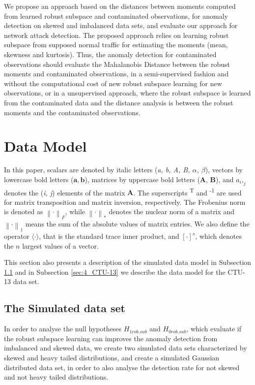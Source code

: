We propose an approach based on the distances between moments computed from learned robust subspace and contaminated observations, for anomaly detection on skewed and imbalanced data sets, and evaluate our approach for network attack detection. The proposed approach relies on learning robust subspace from supposed normal traffic for estimating the moments (mean, skewness and kurtosis). Thus, the anomaly detection for contaminated observations should evaluate the Mahalanobis Distance between the robust moments and contaminated observations, in a semi-supervised fashion and without the computational cost of new robust subspace learning for new observations, or in a unsupervised approach, where the robust subspace is learned from the contaminated data and the distance analysis is between the robust moments and the contaminated observations. 


\section{Data Model}
\label{sec:4_datamodel}

In this paper, scalars are denoted by italic letters (\emph{a, b, A, B, $\alpha$, $\beta$}), vectors by lowercase bold letters ($\pmb{a}, \pmb{b}$), matrices by uppercase bold letters ($\pmb{A}$, $\pmb{B}$), and $a_i,_j$ denotes the (\emph{i, j}) elements of the matrix $\pmb{A}$. The superscripts \textsuperscript{T} and \textsuperscript{-1} are used for matrix transposition and matrix inversion, respectively. The Frobenius norm is denoted as $\left\| \mathord{\cdot} \right\|_F$, while $\left\| \mathord{\cdot} \right\|_*$ denotes the nuclear norm of a matrix and $\left\| \mathord{\cdot} \right\|_1$ means the sum of the absolute values of matrix entries. We also define the operator $\langle \mathord{\cdot} \rangle$, that is the standard trace inner product, and $[ \mathord{\cdot} ]^s$, which denotes the $n$ largest values of a vector.

This section also presents a description of the simulated data model in Subsection \ref{sec:4_simulation} and in Subsection \ref{sec:4_CTU-13} we describe the data model for the CTU-13 data set.


\subsection{The Simulated data set}
\label{sec:4_simulation}

In order to analyse the null hypotheses $H_{1rob.sub}$ and $H_{0rob.sub}$, which evaluate if the robust subspace learning can improves the anomaly detection from imbalanced and skewed data, we create two simulated data sets characterized by skewed and heavy tailed distributions, and create a simulated Gaussian distributed data set, in order to also analyse the detection rate for not skewed and not heavy tailed distributions.

